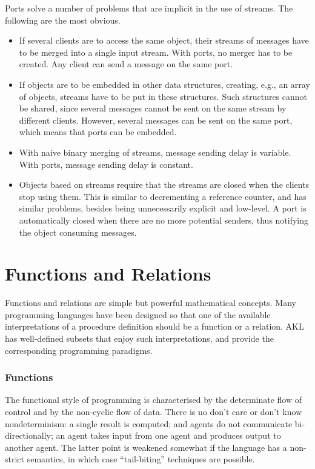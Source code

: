 Ports solve a number of problems that are implicit in the use of
streams.  The following are the most obvious.
%
\begin{itemize}
\item
If several clients are to access the same object, their streams of
messages have to be merged into a single input stream.  With ports, no
merger has to be created.  Any client can send a message on the same
port.
\item
If objects are to be embedded in other data structures, creating,
e.g., an array of objects, streams have to be put in these structures.
Such structures cannot be shared, since several messages cannot be
sent on the same stream by different clients.  However, several
messages can be sent on the same port, which means that ports can be
embedded.
\item
With naive binary merging of streams, message sending delay is
variable.  With ports, message sending delay is constant.
\item
Objects based on streams require that the streams are closed when the 
clients stop using them.  This is similar to decrementing a reference 
counter, and has similar problems, besides being unnecessarily explicit 
and low-level.  A port is automatically closed when there are no more 
potential senders, thus notifying the object consuming messages.
\end{itemize}

\section{Functions and Relations}

Functions and relations are simple but powerful mathematical concepts.
Many programming languages have been designed so that one of the
available interpretations of a procedure definition should be a
function or a relation.  AKL has well-defined subsets that enjoy such
interpretations, and provide the corresponding programming paradigms.

\subsubsection{Functions}

The functional style of programming is characterised by the
determinate flow of control and by the non-cyclic flow of data.  There
is no don't care or don't know nondeterminism: a single result is
computed; and agents do not communicate bi-directionally; an agent
takes input from one agent and produces output to another agent.  The
latter point is weakened somewhat if the language has a non-strict
semantics, in which case ``tail-biting'' techniques are possible.

